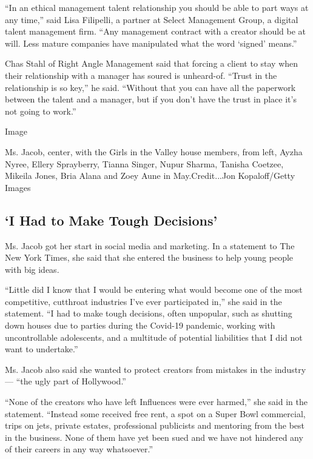 ``In an ethical management talent relationship you should be able to
part ways at any time,'' said Lisa Filipelli, a partner at Select
Management Group, a digital talent management firm. ``Any management
contract with a creator should be at will. Less mature companies have
manipulated what the word `signed' means.''

Chas Stahl of Right Angle Management said that forcing a client to stay
when their relationship with a manager has soured is unheard-of. ``Trust
in the relationship is so key,'' he said. ``Without that you can have
all the paperwork between the talent and a manager, but if you don't
have the trust in place it's not going to work.''

Image

Ms. Jacob, center, with the Girls in the Valley house members, from
left, Ayzha Nyree, Ellery Sprayberry, Tianna Singer, Nupur Sharma,
Tanisha Coetzee, Mikeila Jones, Bria Alana and Zoey Aune in
May.Credit...Jon Kopaloff/Getty Images

\hypertarget{i-had-to-make-tough-decisions}{%
\subsection{`I Had to Make Tough
Decisions'}\label{i-had-to-make-tough-decisions}}

Ms. Jacob got her start in social media and marketing. In a statement to
The New York Times, she said that she entered the business to help young
people with big ideas.

``Little did I know that I would be entering what would become one of
the most competitive, cutthroat industries I've ever participated in,''
she said in the statement. ``I had to make tough decisions, often
unpopular, such as shutting down houses due to parties during the
Covid-19 pandemic, working with uncontrollable adolescents, and a
multitude of potential liabilities that I did not want to undertake.''

Ms. Jacob also said she wanted to protect creators from mistakes in the
industry --- ``the ugly part of Hollywood.''

``None of the creators who have left Influences were ever harmed,'' she
said in the statement. ``Instead some received free rent, a spot on a
Super Bowl commercial, trips on jets, private estates, professional
publicists and mentoring from the best in the business. None of them
have yet been sued and we have not hindered any of their careers in any
way whatsoever.''

